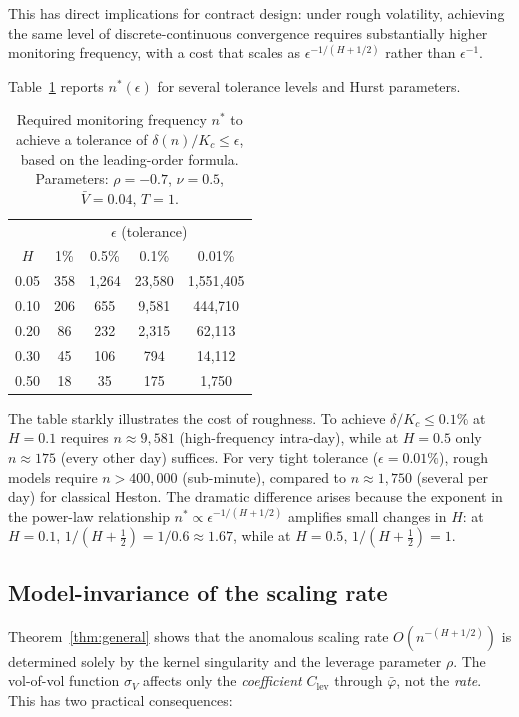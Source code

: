 \documentclass[12pt]{article}
\theoremstyle{definition}
\begin{document}
This has direct implications for contract design: under rough
volatility, achieving the same level of discrete-continuous
convergence requires substantially higher monitoring frequency,
with a cost that scales as $\epsilon^{-1/(H+1/2)}$ rather than
$\epsilon^{-1}$.

Table~\ref{tab:optimal-n} reports $n^*(\epsilon)$ for several
tolerance levels and Hurst parameters.

\begin{table}[htbp]
\centering
\caption{Required monitoring frequency $n^*$ to achieve a tolerance
of $\delta(n)/K_c \le \epsilon$, based on the leading-order formula.
Parameters: $\rho = -0.7$, $\nu = 0.5$, $\bar V = 0.04$, $T = 1$.}
\label{tab:optimal-n}
\begin{tabular}{ccccc}
\toprule
& \multicolumn{4}{c}{$\epsilon$ (tolerance)} \\
$H$ & 1\% & 0.5\% & 0.1\% & 0.01\% \\
\midrule
0.05 & 358 & 1{,}264 & 23{,}580 & 1{,}551{,}405 \\
0.10 & 206 & 655 & 9{,}581 & 444{,}710 \\
0.20 & 86 & 232 & 2{,}315 & 62{,}113 \\
0.30 & 45 & 106 & 794 & 14{,}112 \\
0.50 & 18 & 35 & 175 & 1{,}750 \\
\bottomrule
\end{tabular}
\end{table}

The table starkly illustrates the cost of roughness.
To achieve $\delta/K_c \le 0.1\%$ at $H = 0.1$ requires $n \approx 9{,}581$
(high-frequency intra-day), while at $H = 0.5$ only $n \approx 175$
(every other day) suffices.
For very tight tolerance ($\epsilon = 0.01\%$), rough models require
$n > 400{,}000$ (sub-minute), compared to $n \approx 1{,}750$ (several per day)
for classical Heston.
The dramatic difference arises because the exponent in the
power-law relationship $n^* \propto \epsilon^{-1/(H+1/2)}$ amplifies
small changes in $H$: at $H = 0.1$, $1/(H+\tfrac12) = 1/0.6 \approx 1.67$,
while at $H = 0.5$, $1/(H+\tfrac12) = 1$.

\subsection{Model-invariance of the scaling rate}

Theorem~\ref{thm:general} shows that the anomalous scaling rate
$O(n^{-(H+1/2)})$ is determined solely by the kernel singularity
and the leverage parameter $\rho$.
The vol-of-vol function $\sigma_V$ affects only the \emph{coefficient}
$C_{\mathrm{lev}}$ through $\bar\varphi$, not the \emph{rate}.
This has two practical consequences:
\end{document}
